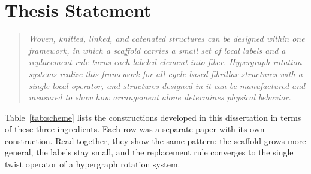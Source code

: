 \section{Thesis Statement}
\label{sec:goal}

\begin{quote}
\emph{Woven, knitted, linked, and catenated structures can be designed within one framework, in which a scaffold carries a small set of local labels and a replacement rule turns each labeled element into fiber. Hypergraph rotation systems realize this framework for all cycle-based fibrillar structures with a single local operator, and structures designed in it can be manufactured and measured to show how arrangement alone determines physical behavior.}
\end{quote}

Table~\ref{tab:scheme} lists the constructions developed in this dissertation in terms of these three ingredients. Each row was a separate paper with its own construction. Read together, they show the same pattern: the scaffold grows more general, the labels stay small, and the replacement rule converges to the single twist operator of a hypergraph rotation system.

